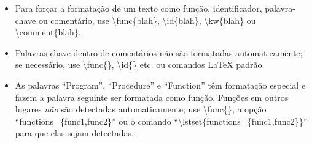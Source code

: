 \begin{itemize}
    \item Para forçar a formatação de um texto como função, identificador,
          palavra-chave ou comentário, use \textsf{\textbackslash{}func\{blah\}},
          \textsf{\textbackslash{}id\{blah\}}, \textsf{\textbackslash{}kw\{blah\}} ou
          \textsf{\textbackslash{}comment\{blah\}}.

    \item Palavras-chave dentro de comentários não são formatadas
          automaticamente; se necessário, use \textsf{\textbackslash{}func\{\}},
          \textsf{\textbackslash{}id\{\}} etc. ou comandos \LaTeX{} padrão.

    \item As palavras ``Program'', ``Procedure'' e ``Function'' têm formatação
          especial e fazem a palavra seguinte ser formatada como função.
          Funções em outros lugares \emph{não} são detectadas automaticamente;
          use \textsf{\textbackslash{}func\{\}}, a opção ``\textsf{functions=\{func1,func2\}}''
          ou o comando ``\textsf{\textbackslash{}lstset\{functions=\{func1,func2\}\}}''
          para que elas sejam detectadas.
\end{itemize}


